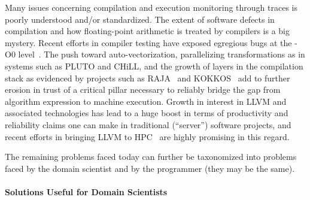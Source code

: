 Many issues concerning compilation and execution monitoring through traces 
is poorly understood and/or standardized.
%
The extent of software defects in compilation and how floating-point arithmetic
is treated by compilers is a big mystery.
%
Recent efforts in compiler testing have exposed egregious bugs at the {-O0} 
level~\cite{regehr-O0-bug}.
%
The push toward auto-vectorization, parallelizing transformations as in
systems such as PLUTO and CHiLL, and the growth of layers in the compilation
stack as evidenced by projects such as RAJA~\cite{raja} and KOKKOS~\cite{kokkos}
add to further erosion in trust of a critical pillar necessary to reliably
bridge the gap from algorithm expression to machine execution.
%
Growth in interest in LLVM and associated technologies has lead to
a huge boost in terms of productivity and reliability claims one can
make in traditional (``server'') software projects, and recent
efforts in bringing LLVM to HPC~\cite{llvm-hpc} are highly 
promising in this regard.

 
 The remaining problems faced today
 can further be taxonomized into problems faced
 by the domain scientist and by the programmer (they may be the same).
 
 \paragraph{Solutions Useful for Domain Scientists}
 
